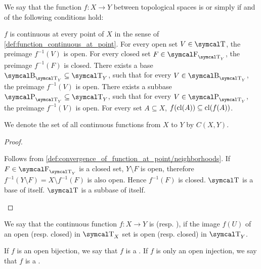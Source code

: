 \begin{definition}\label{def:continuous_function}
  We say that the function \( f: X \to Y \) between topological spaces is  or simply  if and of the following conditions hold:
  \begin{defenum}
     \( f \) is continuous at every point of \( X \) in the sense of \cref{def:function_continuous_at_point}.
     For every open set \( V \in \CT \), the preimage \( f^{-1}(V) \) is open.
     For every closed set \( F \in \CF_{\CT_Y} \), the preimage \( f^{-1}(F) \) is closed.
     There exists a base \( \CB_{\CT_Y} \subseteq \CT_Y \), such that for every \( V \in \CB_{\CT_Y} \), the preimage \( f^{-1}(V) \) is open.
     There exists a subbase \( \CP_{\CT_Y} \subseteq \CT_Y \), such that for every \( V \in \CP_{\CT_Y} \), the preimage \( f^{-1}(V) \) is open.
     For every set \( A \subseteq X \), \( f(\operatorname{cl}(A)) \subseteq \operatorname{cl}(f(A)) \).
  \end{defenum}

  We denote the set of all continuous functions from \( X \) to \( Y \) by \( C(X, Y) \).
\end{definition}
\begin{proof}
  \begin{description}
     Follows from \cref{def:convergence_of_function_at_point/neighborhoods}.
     If \( F \in \CF_{\CT_Y} \) is a closed set, \( Y \setminus F \) is open, therefore \( f^{-1}(Y \setminus F) = X \setminus f^{-1}(F) \) is also open. Hence \( f^{-1}(F) \) is closed.
     \( \CT \) is a base of itself.
     \( \CT \) is a subbase of itself.
  \end{description}
\end{proof}

\begin{definition}\label{def:homeomorphism}
  We say that the continuous function \( f: X \to Y \) is  (resp. ), if the image \( f(U) \) of an open (resp. closed) in \( \CT_X \) set is open (resp. closed) in \( \CT_Y \).

  If \( f \) is an open bijection, we say that \( f \) is a . If \( f \) is only an open injection, we say that \( f \) is a .
\end{definition}

